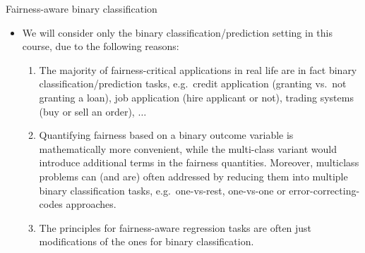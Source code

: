 \documentclass[11pt,compress,t,notes=noshow, xcolor=table]{beamer}
\begin{document}
\begin{vbframe}{Fairness-aware binary classification}
%	
\begin{itemize}
%	
\small
\item  We will consider only the binary classification/prediction setting in this course, due to the following reasons:
	\begin{enumerate}
		\small
%		
		\item The majority of fairness-critical applications in real life are in fact binary classification/prediction tasks, e.g.\ credit application (granting vs.\ not granting a loan), job application (hire applicant or not), trading systems (buy or sell an order), $\ldots$
%		
		\item Quantifying fairness based on a binary outcome variable is mathematically more convenient, while the multi-class
		variant would introduce additional terms in the fairness quantities. Moreover, multiclass problems can (and are) often addressed by reducing them into multiple binary classification tasks, e.g.\ one-vs-rest, one-vs-one or error-correcting-codes approaches.
%
		\item The principles for fairness-aware regression tasks are often just modifications of the ones for binary classification.
%
	\end{enumerate}
%    
\end{itemize} 
%
\end{vbframe}
\end{document}
